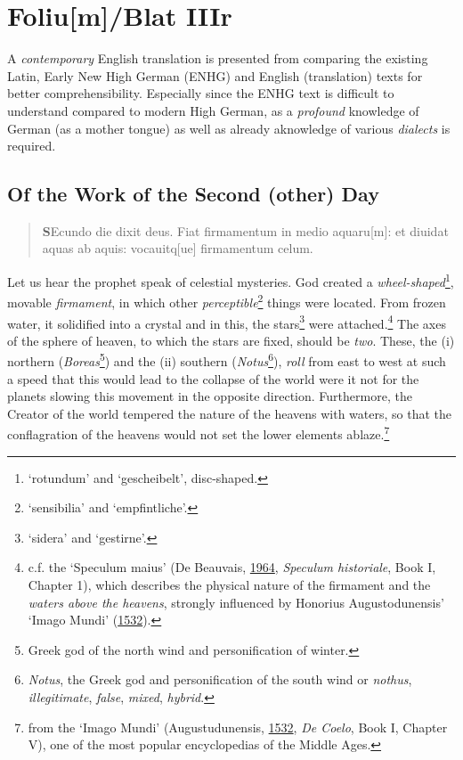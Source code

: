 \documentclass[
]{article}
\author{Dietmar Gerald Schrausser}
\date{09.05.2026}
\begin{document}
\hypertarget{foliumblat-iiir}{%
\section{Foliu{[}m{]}/Blat IIIr}\label{foliumblat-iiir}}

A \emph{contemporary} English translation is presented from comparing
the existing Latin, Early New High German (ENHG) and English
(translation) texts for better comprehensibility. Especially since the
ENHG text is difficult to understand compared to modern High German, as
a \emph{profound} knowledge of German (as a mother tongue) as well as
already aknowledge of various \emph{dialects} is required.

\hypertarget{of-the-work-of-the-second-other-day}{%
\subsection{Of the Work of the Second (other)
Day}\label{of-the-work-of-the-second-other-day}}

\begin{quote}
\textbf{S}Ecundo die dixit deus. Fiat firmamentum in medio
aquaru{[}m{]}: et diuidat aquas ab aquis: vocauitq{[}ue{]} firmamentum
celum.
\end{quote}

Let us hear the prophet speak of celestial mysteries. God created a
\emph{wheel-shaped}\footnote{`rotundum' and `gescheibelt', disc-shaped.},
movable \emph{firmament}, in which other \emph{perceptible}\footnote{`sensibilia'
  and `empfintliche'.} things were located. From frozen water, it
solidified into a crystal and in this, the stars\footnote{`sidera' and
  `gestirne'.} were attached.\footnote{c.f. the `Speculum maius' (De
  Beauvais,
  \href{https://nbn-resolving.org/urn:nbn:de:hbz:061:1-20612}{1964},
  \emph{Speculum historiale}, Book I, Chapter 1), which describes the
  physical nature of the firmament and the \emph{waters above the
  heavens}, strongly influenced by Honorius Augustodunensis' `Imago
  Mundi'
  (\href{https://archive.org/detail/DHonoriiAugustudunensisLibriSeptem/page/n6/mode/1up}{1532}).}
The axes of the sphere of heaven, to which the stars are fixed, should
be \emph{two}. These, the (i) northern (\emph{Boreas}\footnote{Greek god
  of the north wind and personification of winter.}) and the (ii)
southern (\emph{Notus}\footnote{\emph{Notus}, the Greek god and
  personification of the south wind or \emph{nothus},
  \emph{illegitimate}, \emph{false}, \emph{mixed}, \emph{hybrid}.}),
\emph{roll} from east to west at such a speed that this would lead to
the collapse of the world were it not for the planets slowing this
movement in the opposite direction. Furthermore, the Creator of the
world tempered the nature of the heavens with waters, so that the
conflagration of the heavens would not set the lower elements
ablaze.\footnote{from the `Imago Mundi' (Augustudunensis,
  \href{https://archive.org/detail/DHonoriiAugustudunensisLibriSeptem/page/n6/mode/1up}{1532},
  \emph{De Coelo}, Book I, Chapter V), one of the most popular
  encyclopedias of the Middle Ages.}
\end{document}
